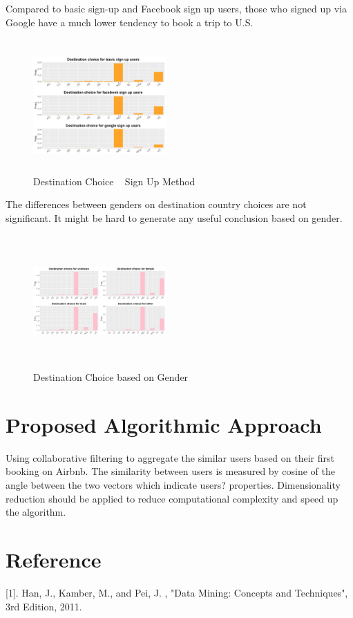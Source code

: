 \documentclass{sig-alternate-05-2015}
\begin{document}
Compared to basic sign-up and Facebook sign up users, those who signed up via Google have a much lower tendency to book a trip to U.S.

\begin{figure}
\centering
\includegraphics[height=2in, width=2in]{3}
\caption{Destination Choice ~ Sign Up Method}
\vskip -6pt
\end{figure}

The differences between genders on destination country choices are not significant. It might be hard to generate any useful conclusion based on gender.

\begin{figure}
\centering
\includegraphics[height=2in, width=2in]{4}
\caption{Destination Choice based on Gender}
\vskip -6pt
\end{figure}

\FloatBarrier
\section{Proposed Algorithmic Approach}
Using collaborative filtering to aggregate the similar users based on their first booking on Airbnb. The similarity between users is measured by cosine of the angle between the two vectors which indicate users? properties. Dimensionality reduction should be applied to reduce computational complexity and speed up the algorithm.

\section{Reference}
[1]. Han, J., Kamber, M., and Pei, J. , "Data Mining: Concepts and Techniques", 3rd Edition, 2011.
\end{document}
